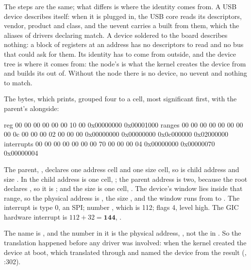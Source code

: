  The steps are the same; what differs is where the identity comes from. A USB device
describes itself: when it is plugged in, the USB core reads its descriptors, vendor, product and
class, and the uevent carries a  built from them, which the aliases of
drivers declaring  match. A device soldered to the board
describes nothing: a block of registers at an address has no descriptors to read and no bus that
could ask for them. Its identity has to come from outside, and the device tree is where it comes
from: the node's  is what the kernel creates the device from and builds its
 out of. Without the node there is no device, no uevent and nothing to match.


 The bytes, which  prints, grouped four to a cell, most significant
first, with the parent's  alongside:

\begin{console}
reg         00 00 00 00  00 00 10 00
            0x00000000   0x00001000
ranges      00 00 00 00  00 00 00 00  0c 00 00 00  02 00 00 00
            0x00000000   0x00000000   0x0c000000   0x02000000
interrupts  00 00 00 00  00 00 00 70  00 00 00 04
            0x00000000   0x00000070   0x00000004
\end{console}

\noindent The parent, , declares one address cell and one size cell, so
 is child address  and size . In  the child address is
one cell, ; the parent address is two, because the root declares
, so it is ; and the size is one cell,
. The device's window lies inside that range, so the physical address is
 \textbf{}, the size , and the window
runs from  to . The interrupt is type 0, an SPI; number
, which is 112; flags 4, level high. The GIC hardware interrupt is
$112 + 32 = \mathbf{144}$, .

 The name is , and the number in it is the physical address,
, not the  in . So the translation happened before any driver
was involved: when the kernel created the device at boot, which translated  through
 and named the device from the result (,
:302).

